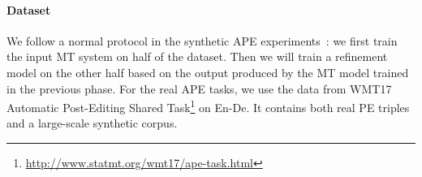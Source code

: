 \documentclass{article}
\begin{document}
\paragraph{Dataset}
We follow a normal protocol in the synthetic APE experiments~\citep{grangier2017quickedit}:
we first train the input MT system on half of the dataset. Then we will train a refinement model on the other half based on the output produced by the MT model trained in the previous phase.
For the real APE tasks, we use the data from WMT17 Automatic Post-Editing Shared Task\footnote{\url{http://www.statmt.org/wmt17/ape-task.html}} on En-De. It contains both real PE triples and a large-scale synthetic corpus.
\begin{table}[t]
    \centering
    \caption{\label{table.ape}Performance (BLEU $\uparrow$ / case-sensitive TER $\downarrow$) comparison on APE. ``do nothing'' represents the results of the original MT system output; the autoregressive model uses beam-size $4$. For the proposed LevT, we use ``scratch'' to denote training from scratch on the APE triple data, and use ``zero-shot'' to denote applying an MT pre-trained LevT model directly for post-editing tasks. The same model can be further fine-tuned. 
    All scores with \underline{underlines} are from the model trained with an autoregressive teacher model (distillation) as the expert policy.}

    
\end{table}
\end{document}
